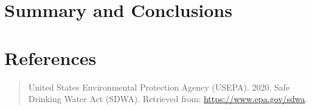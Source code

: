 \documentclass[12pt,]{article}
\begin{document}
\newpage

\hypertarget{summary-and-conclusions}{%
\section{Summary and Conclusions}\label{summary-and-conclusions}}

\newpage

\hypertarget{references}{%
\section{References}\label{references}}

\begin{quote}
United States Environmental Protection Agency (USEPA). 2020. Safe
Drinking Water Act (SDWA). Retrieved from:
\url{https://www.epa.gov/sdwa}.
\end{quote}
\end{document}
